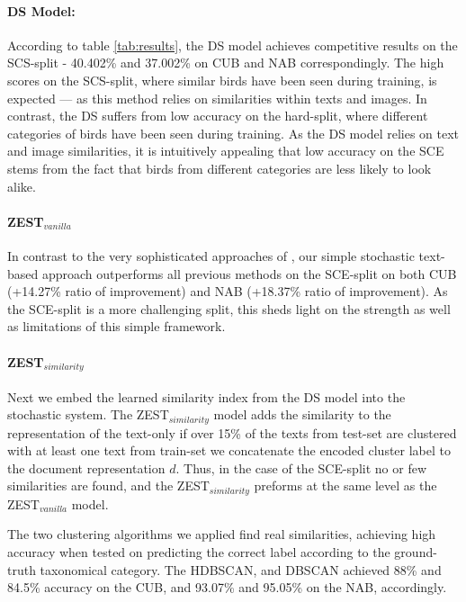 \documentclass[11pt,a4paper]{article}
\newcommand\reut[1]{\textcolor{green}{\textbf{REUT:} #1 }}
\begin{document}
\paragraph{DS Model:} 
According to table \ref{tab:results}, the DS model achieves competitive results on the SCS-split - 40.402\% and 37.002\% on CUB and NAB correspondingly. The high scores on the SCS-split, where similar birds have been seen during training, is expected --- as this method relies on similarities within texts and images. 
%
In contrast, the DS suffers from low accuracy on the hard-split, where different categories of birds have been seen  during training. As the DS model relies on text and image similarities, it is intuitively appealing that low accuracy on the SCE stems from the fact that birds from different categories are less likely to look alike. 

\paragraph{ZEST$_{vanilla}$}
In contrast to the very sophisticated approaches of \citet{zhu2018generative}, our simple stochastic text-based approach outperforms all previous methods on the SCE-split on both CUB (+14.27\% ratio of improvement) and NAB (+18.37\%  ratio of improvement). As the SCE-split is a more challenging split, this sheds light on the strength as well as limitations of this simple framework.  

\paragraph{ZEST$_{similarity}$}

Next we embed the learned similarity index from the DS model into the stochastic system. %
The ZEST$_{similarity}$ model adds the similarity to the representation of the text-only if over 15\% of the texts from test-set are clustered with at least one text from train-set we concatenate the encoded cluster label to the document representation $d$. 
Thus, in the case of the SCE-split no or few similarities are found, and the ZEST$_{similarity}$ preforms at the same level as the ZEST$_{vanilla}$ model. 



The two clustering algorithms we applied find real similarities, achieving high accuracy when tested on predicting the correct label according to the ground-truth taxonomical category. The HDBSCAN, and DBSCAN achieved 88\% and 84.5\% accuracy on the CUB, and 93.07\% and 95.05\% on the NAB, accordingly.
\end{document}

